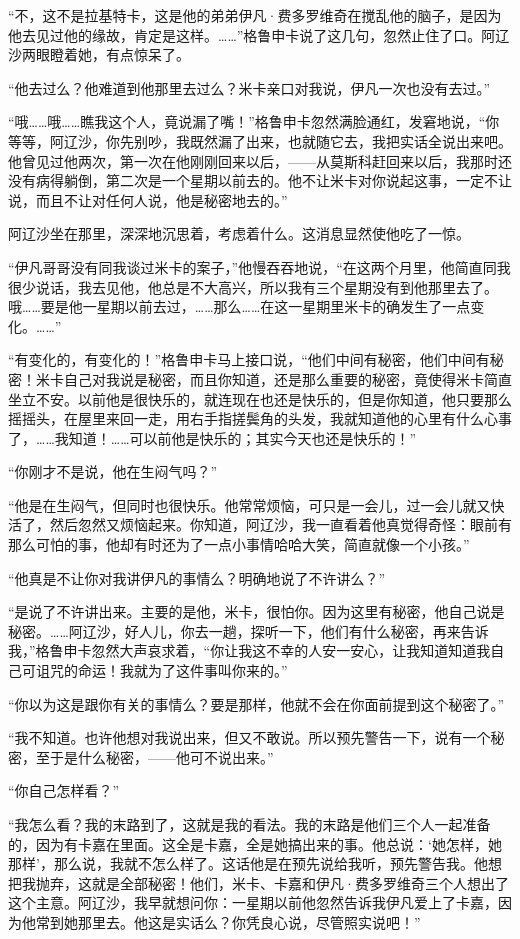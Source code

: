 \par “不，这不是拉基特卡，这是他的弟弟伊凡·费多罗维奇在搅乱他的脑子，是因为他去见过他的缘故，肯定是这样。……”格鲁申卡说了这几句，忽然止住了口。阿辽沙两眼瞪着她，有点惊呆了。
\par “他去过么？他难道到他那里去过么？米卡亲口对我说，伊凡一次也没有去过。”
\par “哦……哦……瞧我这个人，竟说漏了嘴！”格鲁申卡忽然满脸通红，发窘地说，“你等等，阿辽沙，你先别吵，我既然漏了出来，也就随它去，我把实话全说出来吧。他曾见过他两次，第一次在他刚刚回来以后，——从莫斯科赶回来以后，我那时还没有病得躺倒，第二次是一个星期以前去的。他不让米卡对你说起这事，一定不让说，而且不让对任何人说，他是秘密地去的。”
\par 阿辽沙坐在那里，深深地沉思着，考虑着什么。这消息显然使他吃了一惊。
\par “伊凡哥哥没有同我谈过米卡的案子，”他慢吞吞地说，“在这两个月里，他简直同我很少说话，我去见他，他总是不大高兴，所以我有三个星期没有到他那里去了。哦……要是他一星期以前去过，……那么……在这一星期里米卡的确发生了一点变化。……”
\par “有变化的，有变化的！”格鲁申卡马上接口说，“他们中间有秘密，他们中间有秘密！米卡自己对我说是秘密，而且你知道，还是那么重要的秘密，竟使得米卡简直坐立不安。以前他是很快乐的，就连现在也还是快乐的，但是你知道，他只要那么摇摇头，在屋里来回一走，用右手指搓鬓角的头发，我就知道他的心里有什么心事了，……我知道！……可以前他是快乐的；其实今天也还是快乐的！”
\par “你刚才不是说，他在生闷气吗？”
\par “他是在生闷气，但同时也很快乐。他常常烦恼，可只是一会儿，过一会儿就又快活了，然后忽然又烦恼起来。你知道，阿辽沙，我一直看着他真觉得奇怪：眼前有那么可怕的事，他却有时还为了一点小事情哈哈大笑，简直就像一个小孩。”
\par “他真是不让你对我讲伊凡的事情么？明确地说了不许讲么？”
\par “是说了不许讲出来。主要的是他，米卡，很怕你。因为这里有秘密，他自己说是秘密。……阿辽沙，好人儿，你去一趟，探听一下，他们有什么秘密，再来告诉我，”格鲁申卡忽然大声哀求着，“你让我这不幸的人安一安心，让我知道知道我自己可诅咒的命运！我就为了这件事叫你来的。”
\par “你以为这是跟你有关的事情么？要是那样，他就不会在你面前提到这个秘密了。”
\par “我不知道。也许他想对我说出来，但又不敢说。所以预先警告一下，说有一个秘密，至于是什么秘密，——他可不说出来。”
\par “你自己怎样看？”
\par “我怎么看？我的末路到了，这就是我的看法。我的末路是他们三个人一起准备的，因为有卡嘉在里面。这全是卡嘉，全是她搞出来的事。他总说：‘她怎样，她那样’，那么说，我就不怎么样了。这话他是在预先说给我听，预先警告我。他想把我抛弃，这就是全部秘密！他们，米卡、卡嘉和伊凡·费多罗维奇三个人想出了这个主意。阿辽沙，我早就想问你：一星期以前他忽然告诉我伊凡爱上了卡嘉，因为他常到她那里去。他这是实话么？你凭良心说，尽管照实说吧！”

